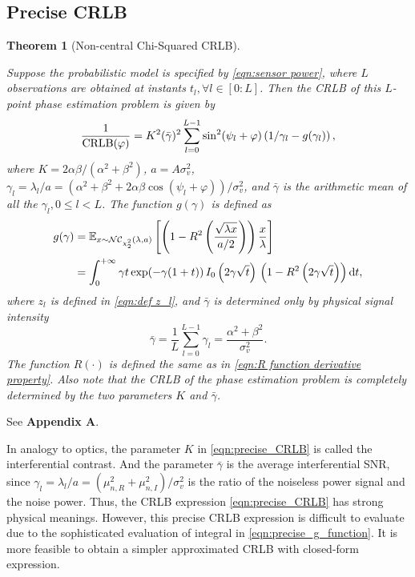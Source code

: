 \documentclass[12pt,draftclsnofoot,journal,onecolumn]{IEEEtran}
\newtheorem{theorem}{\bf Theorem}
\theoremstyle{nonumberplain}
\def \exp {\text{exp}}
\def \nc {\mathcal{NC}}
\begin{document}
\subsection{Precise CRLB}
    \begin{theorem}[Non-central Chi-Squared CRLB] \label{thm:precise CRLB}\mbox{}\par
        Suppose the probabilistic model is specified by \eqref{eqn:sensor power}, where $L$ observations are obtained at instants $t_l, \forall l\in[0:L]$. Then the CRLB of this $L$-point phase estimation problem is given by
        \begin{equation}
            \frac{1}{{\rm CRLB}(\varphi)} = K^2(\bar{\gamma})^2 \sum_{l=0}^{L-1}\sin^2(\psi_l+\varphi)\left(1/\gamma_l-g(\gamma_l)\right),
            \label{eqn:precise_CRLB}
        \end{equation}
        where $K=2\alpha\beta/(\alpha^2+\beta^2)$, $a=A\sigma_v^2$, $\gamma_l=\lambda_l/a=\left(\alpha^2+\beta^2+2\alpha\beta \cos(\psi_l+\varphi)\right)/\sigma_v^2$, and $\bar{\gamma}$ is the arithmetic mean of all the $\gamma_l, 0\leq l<L$. The function $g(\gamma)$ is defined as 
        \begin{equation}
            \begin{aligned}
                g(\gamma) &= \mathbb{E}_{x\sim \nc_{\chi_2^2}(\lambda, a)}\left[\left(1-R^2\left(\frac{\sqrt{\lambda x}}{a/2}\right)\right)\frac{x}{\lambda}\right] \\
                & = \int_{0}^{+\infty}\gamma t \, \exp(-\gamma(1+t))\, I_0\left(2\gamma\sqrt{t}\right)\,\left(1-R^2\left(2\gamma\sqrt{t}\right)\right){\rm d}t,
            \end{aligned}
            \label{eqn:precise_g_function}
        \end{equation}
        where $z_l$ is defined in \eqref{eqn:def z_l}, and $\bar{\gamma}$ is determined only by physical signal intensity
        \begin{equation}
            \bar{\gamma} = \frac{1}{L}\sum_{l=0}^{L-1}{\gamma_l} = \frac{\alpha^2+\beta^2}{\sigma_v^2}.
        \end{equation}
        The function $R(\cdot)$ is defined the same as in \eqref{eqn:R function derivative property}. Also note that the CRLB of the phase estimation problem is completely determined by the two parameters $K$ and $\bar{\gamma}$. 
    \end{theorem}
    \begin{IEEEproof}
        See {\bf Appendix A}. 
    \end{IEEEproof}
    In analogy to optics, the parameter $K$ in \eqref{eqn:precise_CRLB} is called the interferential contrast. And the parameter $\bar{\gamma}$ is the average interferential SNR, since $\gamma_l=\lambda_l/a = (\mu_{n,R}^2+\mu_{n,I}^2)/\sigma_v^2$ is the ratio of the noiseless power signal and the noise power. Thus, the CRLB expression \eqref{eqn:precise_CRLB} has strong physical meanings. However, this precise CRLB expression is difficult to evaluate due to the sophisticated evaluation of integral in \eqref{eqn:precise_g_function}. It is more feasible to obtain a simpler approximated CRLB with closed-form expression. 
\end{document}
